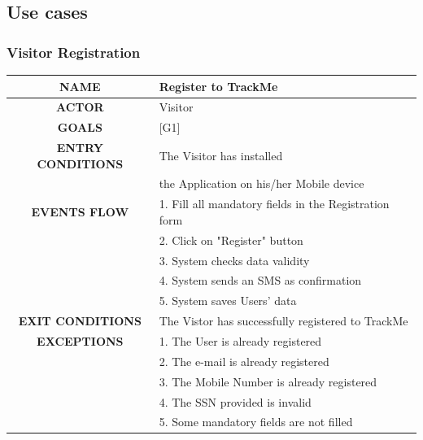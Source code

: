 \documentclass[12pt,a4paper]{article}
\begin{document}
	\newpage
	\subsection{Use cases}
		\subsubsection{Visitor Registration}
		\begin{center}
			\begin{tabular}{| c | l |}
				\hline
				\textbf{NAME} & Register to TrackMe \\
				\hline
				\textbf{ACTOR} & Visitor \\
				\hline
				\textbf{GOALS} & [G1] \\
				\hline
				\textbf{ENTRY CONDITIONS} & The Visitor has installed \\
				&	the Application on his/her Mobile device \\ \hline
				\textbf{EVENTS FLOW}  &
				1. Fill all mandatory fields in the Registration form\\
				&2. Click on "Register" button\\
				&3. System checks data validity\\
				&4. System sends an SMS as confirmation\\
				&5. System saves Users' data\\
				\hline
				\textbf{EXIT CONDITIONS}  & The Vistor has successfully registered to TrackMe\\ \hline
				\textbf{EXCEPTIONS} & 
				1. The User is already registered\\
				&2. The e-mail is already registered\\
				&3. The Mobile Number is already registered\\
				&4. The SSN provided is invalid\\
				&5. Some mandatory fields are not filled\\
				\hline
			\end{tabular}
		\end{center}
	
\end{document}
